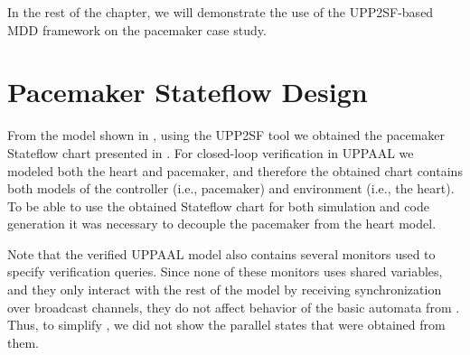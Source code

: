 In the rest of the chapter, we will demonstrate the use of the UPP2SF-based MDD framework on the pacemaker case study. 

\section{Pacemaker Stateflow Design}
\label{sec:pm_sf}

From the model shown in , using the UPP2SF tool we obtained the pacemaker Stateflow chart presented in . For closed-loop verification in UPPAAL we modeled both the heart and pacemaker, and therefore the obtained chart contains both models of the controller (i.e., pacemaker) and environment (i.e., the heart). To be able to use the obtained Stateflow chart for both simulation and code generation it was necessary to decouple the pacemaker from the heart model. 

Note that the verified UPPAAL model also contains several monitors used to specify verification queries. Since none of these monitors uses shared variables, and they only interact with the rest of the model by receiving synchronization over broadcast channels, they do not affect behavior of the basic automata from . Thus, to simplify , we did not show the parallel states that were obtained from them. 



